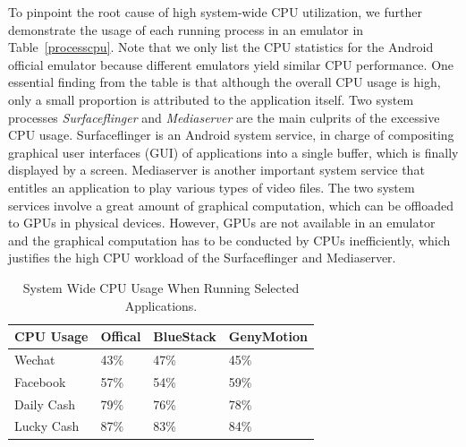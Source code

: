 \documentclass[conference]{IEEEtranl}
\begin{document}
	To pinpoint the root cause of high system-wide CPU utilization, we further demonstrate the usage of each running process in an emulator in Table~\ref{processcpu}. Note that we only list the CPU statistics for the Android official emulator because different emulators yield similar CPU performance. One essential finding from the table is that although the overall CPU usage is high, only a small proportion is attributed to the application itself. Two system processes \textit{Surfaceflinger} and \textit{Mediaserver} are the main culprits of the excessive CPU usage. Surfaceflinger is an Android system service, in charge of compositing graphical user interfaces (GUI) of applications into a single buffer, which is finally displayed by a screen. Mediaserver is another important system service that entitles an application to play various types of video files. The two system services involve a great amount of graphical computation, which can be offloaded to GPUs in physical devices. However, GPUs are not available in an emulator and the graphical computation has to be conducted by CPUs inefficiently,  which justifies the high CPU workload of the Surfaceflinger and Mediaserver.



	\begin{table}[t]
	\centering
	\footnotesize
	\caption{System Wide CPU Usage When Running Selected Applications.}
	\label{tab:precpu}
	\setlength\tabcolsep{10pt}
	\begin{tabular}{|l|l|l|l|}
	\hline
	CPU Usage  & Offical & BlueStack & GenyMotion \\ \hline
	Wechat     & 43\%    & 47\%      & 45\%       \\ \hline
	Facebook   & 57\%    & 54\%      & 59\%       \\ \hline
	Daily Cash & 79\%    & 76\%      & 78\%       \\ \hline
	Lucky Cash & 87\%    & 83\%      & 84\%       \\ \hline
	\end{tabular}
	\vspace{-0.2in}
	\end{table}
\end{document}

